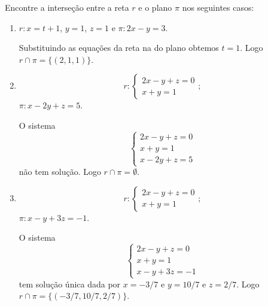 \begin{exemplos}
    Encontre a interse\c{c}\~ao entre a reta $r$ e o plano $\pi$ nos seguintes casos:
    \begin{enumerate}
        \item $r: x = t + 1$, $y = 1$, $z = 1$ e $\pi : 2x - y = 3$.
        \begin{solucao}
            Substituindo as equa\c{c}\~oes da reta na do plano obtemos $t = 1$. Logo $r\cap\pi = \{(2,1,1)\}$.
        \end{solucao}
        \item
        \[
            r: \begin{cases}
                2x - y + z = 0\\
                x + y = 1
            \end{cases};
        \]
        $\pi : x - 2y + z = 5$.
        \begin{solucao}
            O sistema
            \[
                \begin{cases}
                    2x - y + z = 0\\
                    x + y = 1\\
                    x - 2y + z = 5
                \end{cases}
            \]
            n\~ao tem solu\c{c}\~ao. Logo $r\cap\pi = \emptyset$.
        \end{solucao}
        \item
        \[
            r: \begin{cases}
                2x - y + z = 0\\
                x + y = 1
            \end{cases};
        \]
        $\pi : x - y + 3z = -1$.
        \begin{solucao}
            O sistema
            \[
                \begin{cases}
                    2x - y + z = 0\\
                    x + y = 1\\
                    x - y + 3z = -1
                \end{cases}
            \]
            tem solu\c{c}\~ao \'unica dada por $x = -3/7$ e $y = 10/7$ e $z = 2/7$. Logo $r\cap\pi = \{(-3/7, 10/7, 2/7)\}$.
        \end{solucao}
    \end{enumerate}
\end{exemplos}


